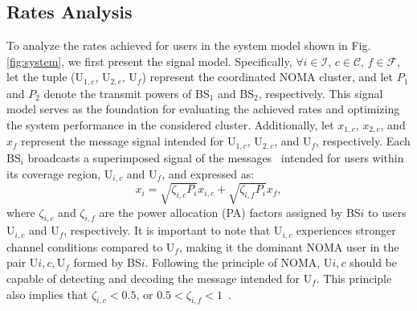 \documentclass[conference]{IEEEtran}
\begin{document}
\subsection{Rates Analysis}
To analyze the rates achieved for users in the system model shown in Fig. \ref{fig:system}, we first present the signal model. Specifically, $\forall i \in \mathcal{I}$, $c \in \mathcal{C}$, $f \in \mathcal{F}$, let the tuple (U$_{1,c}$, U$_{2,c}$, U$_f$) represent the coordinated NOMA cluster, and let $P_1$ and $P_2$ denote the transmit powers of BS$_1$ and BS$_2$, respectively. This signal model serves as the foundation for evaluating the achieved rates and optimizing the system performance in the considered cluster. Additionally, let $x_{1,c}$, $x_{2,c}$, and $x_f$ represent the message signal intended for U$_{1,c}$, U$_{2,c}$, and U$_f$, respectively. Each BS$_i$ broadcasts a superimposed signal of the messages~\cite{saito2013non} intended for users within its coverage region, U$_{i,c}$ and U$_f$, and expressed as:
\begin{equation}
    x_{i}=\sqrt{\zeta_{i,c}P_i}x_{i,c} + \sqrt{\zeta_{i,f}P_i}x_f,
\end{equation}
where $\zeta_{i,c}$ and $\zeta_{i,f}$ are the power allocation (PA) factors assigned by BS$i$ to users U$_{i,c}$ and U$_f$, respectively. It is important to note that U$_{i,c}$ experiences stronger channel conditions compared to U$_f$, making it the dominant NOMA user in the pair ${\text{U}{i,c}, \text{U}_f}$ formed by BS$i$. Following the principle of NOMA, U${i,c}$ should be capable of detecting and decoding the message intended for U$_f$. This principle also implies that $\zeta_{i,c} < 0.5$, or $0.5 < \zeta_{i,f} < 1$~\cite{obeed2020user, salem2020noma}.
\end{document}
